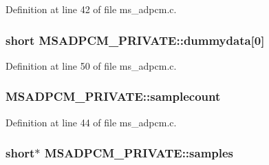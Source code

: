 Definition at line 42 of file ms\+\_\+adpcm.\+c.

\subsubsection[{\texorpdfstring{dummydata}{dummydata}}]{\setlength{\rightskip}{0pt plus 5cm}short M\+S\+A\+D\+P\+C\+M\+\_\+\+P\+R\+I\+V\+A\+T\+E\+::dummydata\mbox{[}0\mbox{]}}\hypertarget{struct_m_s_a_d_p_c_m___p_r_i_v_a_t_e_a5ec05e80eba73a4ab6187688ccdaff34}{}\label{struct_m_s_a_d_p_c_m___p_r_i_v_a_t_e_a5ec05e80eba73a4ab6187688ccdaff34}


Definition at line 50 of file ms\+\_\+adpcm.\+c.

\subsubsection[{\texorpdfstring{samplecount}{samplecount}}]{ M\+S\+A\+D\+P\+C\+M\+\_\+\+P\+R\+I\+V\+A\+T\+E\+::samplecount}\hypertarget{struct_m_s_a_d_p_c_m___p_r_i_v_a_t_e_aba37d12cd0cfbb1952d4c695b4d77d7a}{}\label{struct_m_s_a_d_p_c_m___p_r_i_v_a_t_e_aba37d12cd0cfbb1952d4c695b4d77d7a}


Definition at line 44 of file ms\+\_\+adpcm.\+c.

\subsubsection[{\texorpdfstring{samples}{samples}}]{\setlength{\rightskip}{0pt plus 5cm}short$\ast$ M\+S\+A\+D\+P\+C\+M\+\_\+\+P\+R\+I\+V\+A\+T\+E\+::samples}\hypertarget{struct_m_s_a_d_p_c_m___p_r_i_v_a_t_e_a310622e90cd62c15c62e9822f37d2fa7}{}\label{struct_m_s_a_d_p_c_m___p_r_i_v_a_t_e_a310622e90cd62c15c62e9822f37d2fa7}


